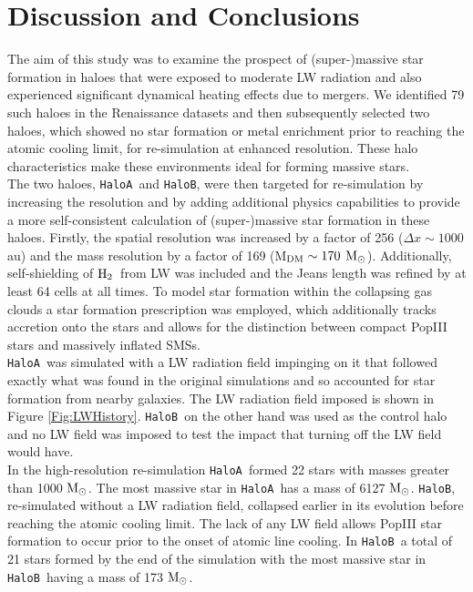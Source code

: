 \documentclass[graphics, twocolumn, usenatbib]{mn2e}
\newcommand{\msolarc} {$\rm{M_{\odot}}$}
\newcommand{\molH} {$\rm{H_2}$~}
\newcommand{\ha} {\texttt{HaloA~}}
\newcommand{\hb} {\texttt{HaloB~}}
\newcommand{\hbc} {\texttt{HaloB}}
\begin{document}
\section{Discussion and Conclusions} \label{Sec:Discussion}
The aim of this study was to examine the prospect of (super-)massive star formation in haloes
that were exposed to moderate LW radiation and also experienced significant dynamical heating
effects due to mergers. We identified 79 such haloes in the Renaissance 
datasets \citep{Regan_2020} and then subsequently selected two haloes, which showed no star formation or metal enrichment prior to reaching the
atomic cooling limit, for re-simulation at enhanced resolution. These halo characteristics make these environments ideal for forming massive
stars. \\
\indent The two haloes, \ha and \hbc, were then targeted for re-simulation by 
increasing the resolution and by adding additional physics capabilities to provide a more self-consistent calculation of (super-)massive star formation in these haloes. Firstly, the spatial resolution was increased by a factor of 256 ($\Delta x \sim 1000$ au) and the mass resolution by a factor of
169 (M$_{\rm DM} \sim 170$ \msolarc). Additionally, self-shielding of \molH from LW was included and the Jeans length was refined by at least 64 cells at all times.  To model star formation within the collapsing gas clouds a star formation prescription was employed, which additionally tracks accretion
onto the stars and allows for the distinction between compact PopIII stars and massively inflated
SMSs. \\
\indent \ha was simulated with a LW radiation field impinging on it that followed exactly what was
found in the original simulations and so accounted for star formation from nearby galaxies. The
LW radiation field imposed is shown in Figure \ref{Fig:LWHistory}. \hb on the other hand was used as the
control halo and no LW field was imposed to test the impact that turning off the LW field would have.\\
\indent In the high-resolution re-simulation \ha formed 22 stars with masses greater than 1000
\msolarc. The most massive star in \ha has a mass of 6127 \msolarc. \hbc, re-simulated without
a LW radiation field, collapsed earlier in its evolution before reaching the atomic cooling limit.
The lack of any LW field allows PopIII star formation to occur prior to the onset of atomic line
cooling. In \hb a total of 21 stars
formed by the end of the simulation with the most massive star in \hb having a mass of 173 \msolarc.
\end{document}
